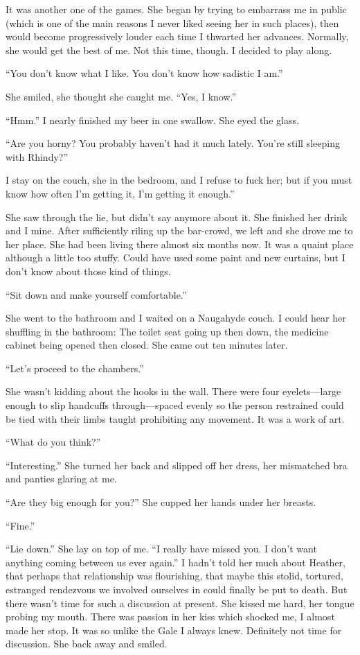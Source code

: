 It was another one of the games. She began by trying to embarrass me in
public (which is one of the main reasons I never liked seeing her in
such places), then would become progressively louder each time I
thwarted her advances. Normally, she would get the best of me. Not this
time, though. I decided to play along.

``You don't know what I like. You don't know how sadistic I am.''

She smiled, she thought she caught me. ``Yes, I know.''

``Hmm.'' I nearly finished my beer in one swallow. She eyed the glass.

``Are you horny? You probably haven't had it much lately. You're still
sleeping with Rhindy?''

I stay on the couch, she in the bedroom, and I refuse to fuck her; but
if you must know how often I'm getting it, I'm getting it enough.''

She saw through the lie, but didn't say anymore about it. She finished
her drink and I mine. After sufficiently riling up the bar-crowd, we
left and she drove me to her place. She had been living there almost six
months now. It was a quaint place although a little too stuffy. Could
have used some paint and new curtains, but I don't know about those kind
of things.

``Sit down and make yourself comfortable.''

She went to the bathroom and I waited on a Naugahyde couch. I could hear
her shuffling in the bathroom: The toilet seat going up then down, the
medicine cabinet being opened then closed. She came out ten minutes
later.

``Let's proceed to the chambers.''

She wasn't kidding about the hooks in the wall. There were four
eyelets---large enough to slip handcuffs through---spaced evenly so the
person restrained could be tied with their limbs taught prohibiting any
movement. It was a work of art.

``What do you think?''

``Interesting.'' She turned her back and slipped off her dress, her
mismatched bra and panties glaring at me.

``Are they big enough for you?'' She cupped her hands under her breasts.

``Fine.''

``Lie down.'' She lay on top of me. ``I really have missed you. I don't
want anything coming between us ever again.'' I hadn't told her much
about Heather, that perhaps that relationship was flourishing, that
maybe this stolid, tortured, estranged rendezvous we involved ourselves
in could finally be put to death. But there wasn't time for such a
discussion at present. She kissed me hard, her tongue probing my mouth.
There was passion in her kiss which shocked me, I almost made her stop.
It was so unlike the Gale I always knew. Definitely not time for
discussion. She back away and smiled.

